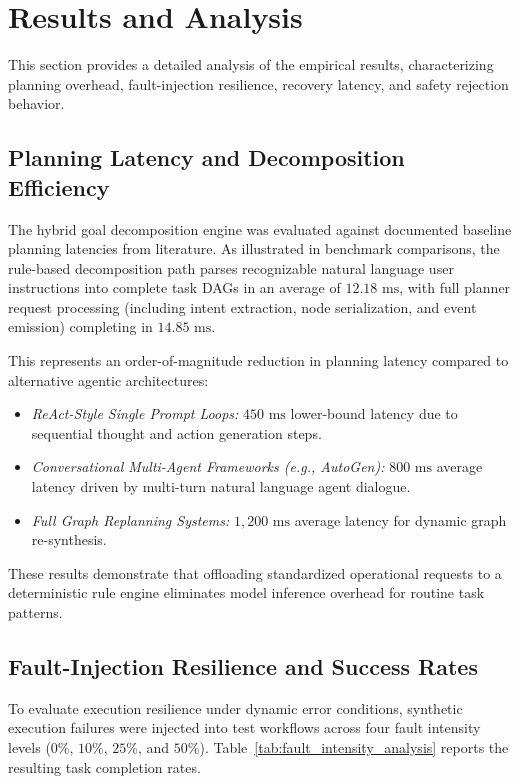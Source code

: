 \documentclass[conference]{IEEEtran}
\begin{document}
\section{Results and Analysis}
\label{sec:results}

This section provides a detailed analysis of the empirical results, characterizing planning overhead, fault-injection resilience, recovery latency, and safety rejection behavior.

\subsection{Planning Latency and Decomposition Efficiency}
The hybrid goal decomposition engine was evaluated against documented baseline planning latencies from literature. As illustrated in benchmark comparisons, the rule-based decomposition path parses recognizable natural language user instructions into complete task DAGs in an average of $12.18\text{ ms}$, with full planner request processing (including intent extraction, node serialization, and event emission) completing in $14.85\text{ ms}$.

This represents an order-of-magnitude reduction in planning latency compared to alternative agentic architectures:
\begin{itemize}
    \item \textit{ReAct-Style Single Prompt Loops:} $450\text{ ms}$ lower-bound latency due to sequential thought and action generation steps.
    \item \textit{Conversational Multi-Agent Frameworks (e.g., AutoGen):} $800\text{ ms}$ average latency driven by multi-turn natural language agent dialogue.
    \item \textit{Full Graph Replanning Systems:} $1,200\text{ ms}$ average latency for dynamic graph re-synthesis.
\end{itemize}
These results demonstrate that offloading standardized operational requests to a deterministic rule engine eliminates model inference overhead for routine task patterns.

\subsection{Fault-Injection Resilience and Success Rates}
To evaluate execution resilience under dynamic error conditions, synthetic execution failures were injected into test workflows across four fault intensity levels ($0\%$, $10\%$, $25\%$, and $50\%$). Table~\ref{tab:fault_intensity_analysis} reports the resulting task completion rates.
\end{document}
